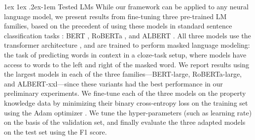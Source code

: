 \documentclass[10pt,letterpaper]{article}
\makeatletter
\newcommand{\km}[1]{\textcolor{purple}{$_{KM}$[#1]}}
\newcommand{\concepts}{\mathcal{C}}
\newcommand{\properties}{\mathcal{P}}
\renewcommand{\paragraph}{%
  \@startsection{paragraph}{4}%
  {\z@}{1ex \@plus 1ex \@minus .2ex}{-1em}%
  {\normalfont\normalsize\bfseries}%
}
\makeatother
\begin{document}
\paragraph{Tested LMs}
While our framework can be applied to any neural language model, we present results from fine-tuning three pre-trained LM families, based on the precedent of using these models in standard sentence classification tasks \citep{wang2018glue}: BERT \citep{devlin-etal-2019-bert}, RoBERTa \citep{liu2019roberta}, and ALBERT \citep{lan2019albert}. 
All three models use the transformer architecture \citep{vaswani2017attention}, and are trained to perform masked language modeling: the task of predicting words in context in a cloze-task setup, where models have access to words to the left and right of the masked word. 
We report results using the largest models in each of the three families---BERT-large, RoBERTa-large, and ALBERT-xxl---since these variants had the best performance in our preliminary experiments.
We fine-tune each of the three models on the property knowledge data by minimizing their binary cross-entropy loss on the training set using the Adam optimizer \citep{kingma2014adam}.
We tune the hyper-parameters (such as learning rate) on the basis of the validation set, and finally evaluate the three adapted models on the test set using the F1 score.

\end{document}

